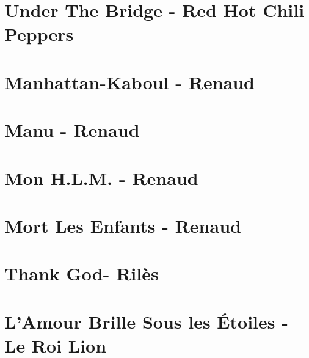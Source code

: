 \documentclass[11pt]{article}
\begin{document}
\section*{Under The Bridge - Red Hot Chili Peppers}
\begin{guitar}

\end{guitar}



\section{Manhattan-Kaboul - Renaud}
\begin{guitar}

\end{guitar}

\section{Manu - Renaud}
\begin{guitar}

\end{guitar}

\section*{Mon H.L.M. - Renaud}
\begin{guitar}

\end{guitar}

\section{Mort Les Enfants - Renaud}
\begin{guitar}

\end{guitar}

\section{Thank God- Rilès}
\begin{guitar}

\end{guitar}

\section{L'Amour Brille Sous les Étoiles - Le Roi Lion}

\end{document}
